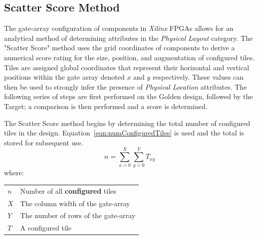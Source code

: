 \documentclass[journal, hidelinks]{IEEEtran}
\makeatletter
\newenvironment{conditions}
{\par\vspace{\abovedisplayskip}\noindent\begin{tabular}{>{$}l<{$} @{${}={}$} l}}
	{\end{tabular}\par\vspace{\belowdisplayskip}}
\makeatother
\begin{document}
\subsection{Scatter Score Method} \label{sec:scatterScore}
The gate-array configuration of components in \textit{Xilinx} FPGAs allows for an analytical method of determining attributes in the \textit{Physical Layout} category.
The "Scatter Score" method uses the grid coordinates of components to derive a numerical score rating for the size, position, and augmentation of configured tiles.
Tiles are assigned global coordinates that represent their horizontal and vertical positions within the gate array denoted $x$ and $y$ respectively. 
These values can then be used to strongly infer the presence of \textit{Physical Location} attributes.
The following series of steps are first performed on the Golden design, followed by the Target; a comparison is then performed and a score is determined.

The Scatter Score method begins by determining the total number of configured tiles in the design.
Equation~\ref{eqn:numConfiguredTiles} is used and the total is stored for subsequent use.
\begin{equation} \label{eqn:numConfiguredTiles}
n = \sum_{x = 0}^{X}\sum_{y = 0}^{Y}T_{xy}
\end{equation}
where:
\begin{conditions}
	n     &  Number of all \textbf{configured} tiles \\
	X     &  The column width of the gate-array \\   
	Y     &  The number of rows of the gate-array \\
	T     &  A configured tile
\end{conditions}
\end{document}
